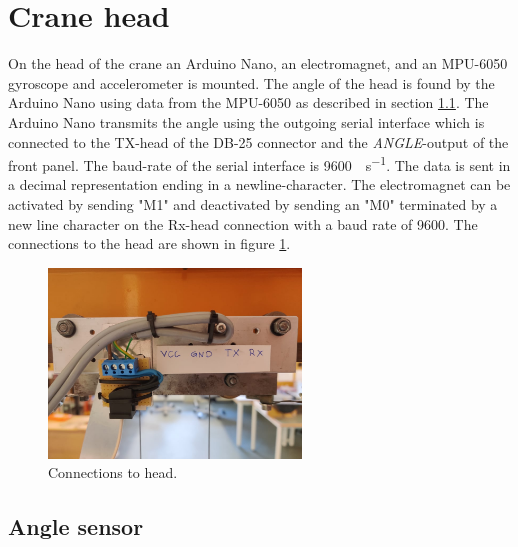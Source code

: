 \section{Crane head}
On the head of the crane an Arduino Nano, an electromagnet, and an MPU-6050 gyroscope and accelerometer is mounted. The angle of the head is found by the Arduino Nano using data from the MPU-6050 as described in section \ref{sec:angleSensor}.  
The Arduino Nano transmits the angle using the outgoing serial interface which is connected to the TX-head of the DB-25 connector and the \textit{ANGLE}-output of the front panel. The baud-rate of the serial interface is \SI{9600}{\baud\per\second}. The data is sent in a decimal representation ending in a newline-character. 
The electromagnet can be activated by sending "M1" and deactivated by sending an "M0" terminated by a new line character on the Rx-head connection with a baud rate of 9600. The connections to the head are shown in figure \ref{fig:head}.

\begin{figure}[H]
    \centering
    \includegraphics[width=0.6\textwidth]{pictures/head.jpg}
    \caption{Connections to head.}
    \label{fig:head}
\end{figure}

\subsection{Angle sensor}\label{sec:angleSensor}

